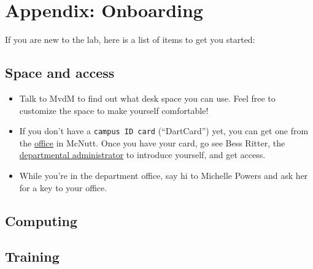 \documentclass{tufte-book}
\newcommand{\doccls}[1]{\texttt{#1}}%
\begin{document}
\chapter{Appendix: Onboarding}

If you are new to the lab, here is a list of items to get you started:

\section{Space and access}

\begin{itemize}
\item{Talk to MvdM to find out what desk space you can use. Feel free
  to customize the space to make yourself comfortable!}
\item{If you don't have a \doccls{campus ID card} (``DartCard'') yet, you can get one
from the
\href{https://www.dartmouth.edu/finance/employee-services/other_services/dartcard/}{office}
in McNutt. Once you have your card, go see Bess Ritter, the \href{https://pbs.dartmouth.edu/people?field_people_local_tags_tid=1916}{departmental
administrator} to introduce yourself, and get access.}
\item{While you're in the department office, say hi to Michelle Powers
and ask her for a key to your office.}
\end{itemize}

\section{Computing}


\section{Training}
\end{document}
